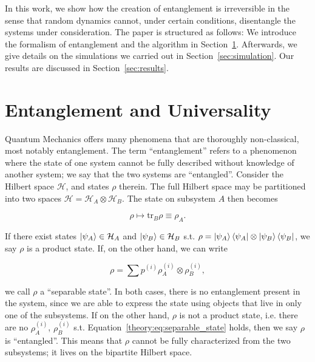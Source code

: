 \documentclass[reprint,amsmath,amssymb,aps,prb,nofootinbib]{revtex4-2}
\begin{document}
    In this work, we show how the creation of entanglement is irreversible in the sense that random dynamics cannot,
    under certain conditions, disentangle the systems under consideration. The paper is structured as follows: We introduce
    the formalism of entanglement and the algorithm in Section~\ref{sec:theory}. Afterwards, we give details on
    the simulations we carried out in Section~\ref{sec:simulation}. Our results are discussed in Section~\ref{sec:results}.

    \section{Entanglement and Universality}
    \label{sec:theory}

    Quantum Mechanics offers many phenomena that are thoroughly non-classical, most notably entanglement. The term
    ``entanglement'' refers to a phenomenon where the state of one system cannot be fully described without knowledge
    of another system; we say that the two systems are ``entangled''. Consider the Hilbert space $\mathcal{H}$,
    and states $\rho$ therein. The full Hilbert space may be partitioned into two spaces
    $\mathcal{H}=\mathcal{H}_A\otimes\mathcal{H}_B$. The state on subsystem $A$ then becomes

    \begin{equation}
        \rho\mapsto\text{tr}_B\rho\equiv \rho_A.
        \label{theory:eq:reduced_state}
    \end{equation}

    If there exist states $\ket{\psi_A}\in\mathcal{H}_A$ and $\ket{\psi_B}\in\mathcal{H}_B$ s.t.
    $\rho=\ket{\psi_A}\bra{\psi_A}\otimes\ket{\psi_B}\bra{\psi_B}$, we say $\rho$ is a product
    state. If, on the other hand, we can write

    \begin{equation}
        \rho=\sum p^{(i)}\rho_A^{(i)}\otimes\rho_B^{(i)},
        \label{theory:eq:separable_state}
    \end{equation}

    we call $\rho$ a ``separable state''. In both cases, there is no entanglement present in the system, since we are
    able to express the state using objects that live in only one of the subsystems. If on the other
    hand, $\rho$ is not a product state, i.e. there are no $\rho_A^{(i)}$, $\rho_B^{(i)}$ s.t. Equation~\ref{theory:eq:separable_state}
    holds, then we say $\rho$ is ``entangled''. This means that $\rho$ cannot be fully characterized from the two
    subsystems; it lives on the bipartite Hilbert space.
\end{document}
